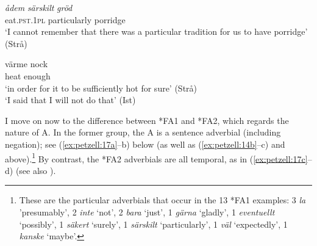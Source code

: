 \documentclass[output=paper,colorlinks,citecolor=brown,draft,draftmode]{langscibook}
\begin{document}
\gll \textit{ådem} \textit{särskilt}      \textit{gröd}   \\
    eat.\textsc{pst}.1\textsc{pl}    particularly    porridge\\
\glt `I cannot remember that there was a particular tradition for us to have porridge’ (Strå)  \\


\gll värme    nock   \\
    heat      enough\\
\glt `in order for it to be sufficiently hot for sure’ (Strå)  \\

\glt `I said that I will not do that’ (Ist)
\z
\z

\ea\label{ex:petzell:16}

\z
\z


I move on now to the difference between *FA1 and *FA2, which regards the nature of A. In the former group, the A is a sentence adverbial (including negation); see (\ref{ex:petzell:17a}–b) below (as well as (\ref{ex:petzell:14b}–c) and  above).\footnote{These are the particular adverbials that occur in the 13 *FA1 examples: 3 \textit{la} ’presumably’, 2 \textit{inte} ‘not’, 2 \textit{bara} ‘just’, 1 \textit{gärna} ‘gladly’, 1 \textit{eventuellt} ‘possibly’, 1 \textit{säkert} ‘surely’, 1 \textit{särskilt} ‘particularly’, 1 \textit{väl} ‘expectedly’, 1 \textit{kanske} ‘maybe’.} By contrast, the *FA2 adverbials are all temporal, as in (\ref{ex:petzell:17c}–d) (see also ).{}
\end{document}
